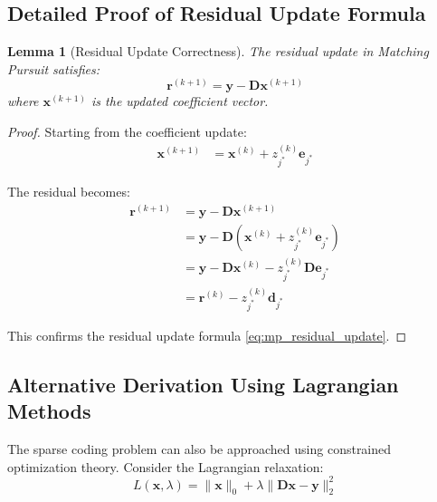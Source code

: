 \documentclass[12pt]{article}
\newtheorem{lemma}[theorem]{Lemma}
\begin{document}
\subsection{Detailed Proof of Residual Update Formula}

\begin{lemma}[Residual Update Correctness]\label{lem:residual_update}
    The residual update in Matching Pursuit satisfies:
    \begin{equation}
        \mathbf{r}^{(k+1)} = \mathbf{y} - \mathbf{D}\mathbf{x}^{(k+1)}
    \end{equation}
    where $\mathbf{x}^{(k+1)}$ is the updated coefficient vector.
\end{lemma}

\begin{proof}
    Starting from the coefficient update:
    \begin{align}
        \mathbf{x}^{(k+1)} & = \mathbf{x}^{(k)} + z_{j^*}^{(k)} \mathbf{e}_{j^*}
    \end{align}

    The residual becomes:
    \begin{align}
        \mathbf{r}^{(k+1)} & = \mathbf{y} - \mathbf{D}\mathbf{x}^{(k+1)}                                          \\
                           & = \mathbf{y} - \mathbf{D}(\mathbf{x}^{(k)} + z_{j^*}^{(k)} \mathbf{e}_{j^*})         \\
                           & = \mathbf{y} - \mathbf{D}\mathbf{x}^{(k)} - z_{j^*}^{(k)} \mathbf{D}\mathbf{e}_{j^*} \\
                           & = \mathbf{r}^{(k)} - z_{j^*}^{(k)} \mathbf{d}_{j^*}
    \end{align}

    This confirms the residual update formula \eqref{eq:mp_residual_update}.
\end{proof}

\subsection{Alternative Derivation Using Lagrangian Methods}

The sparse coding problem can also be approached using constrained optimization theory. Consider the Lagrangian relaxation:
\begin{equation}
    L(\mathbf{x}, \lambda) = \|\mathbf{x}\|_0 + \lambda \|\mathbf{D}\mathbf{x} - \mathbf{y}\|_2^2
\end{equation}
\end{document}
